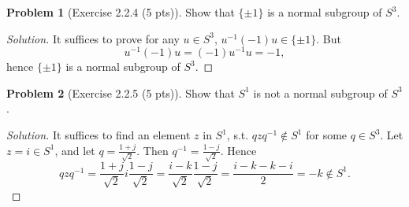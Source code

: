\documentclass{article}
\theoremstyle{definition}
\newtheorem{problem}{Problem}
\theoremstyle{plain}
\begin{document}
\begin{problem}[Exercise 2.2.4 (5 pts)]Show that $\{\pm1\}$ is a normal subgroup of $S^3$.
\end{problem}
\begin{adjustwidth}{0.7cm}{}
\color{blue}
\begin{proof}[Solution]It suffices to prove for any $u\in S^3$, $u^{-1}(-1)u\in\{\pm1\}$. But
\begin{displaymath}
u^{-1}(-1)u=(-1)u^{-1}u=-1,
\end{displaymath}
hence $\{\pm1\}$ is a normal subgroup of $S^3$.
\color{black}
\end{proof}
\end{adjustwidth}

\begin{problem}[Exercise 2.2.5 (5 pts)]Show that $S^1$ is not a normal subgroup of $S^3$.
\end{problem}
\begin{adjustwidth}{0.7cm}{}
\color{blue}
\begin{proof}[Solution]It suffices to find an element $z$ in $S^1$, s.t. $qzq^{-1}\notin S^1$ for some $q\in S^3$. Let $z=i\in S^1$, and let $q=\frac{1+j}{\sqrt{2}}$. Then $q^{-1}=\frac{1-j}{\sqrt{2}}$. Hence
\begin{displaymath}
qzq^{-1}=\frac{1+j}{\sqrt{2}}i\frac{1-j}{\sqrt{2}}=\frac{i-k}{\sqrt{2}}\frac{1-j}{\sqrt{2}}=\frac{i-k-k-i}{2}=-k\notin S^1.
\end{displaymath}
\color{black}
\end{proof}
\end{adjustwidth}
\end{document}
